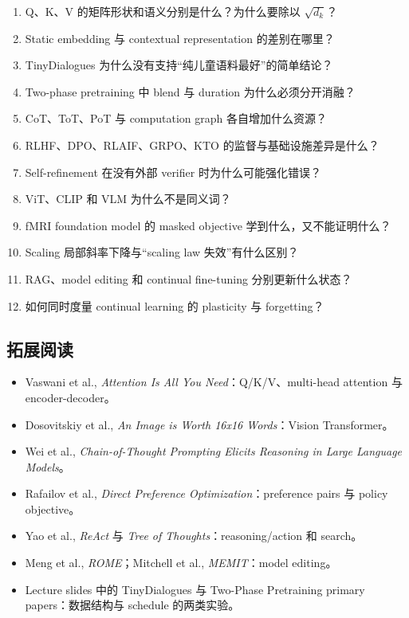 \documentclass[a4paper]{article}
\begin{document}
\begin{enumerate}
  \item Q、K、V 的矩阵形状和语义分别是什么？为什么要除以 $\sqrt{d_k}$？
  \item Static embedding 与 contextual representation 的差别在哪里？
  \item TinyDialogues 为什么没有支持“纯儿童语料最好”的简单结论？
  \item Two-phase pretraining 中 blend 与 duration 为什么必须分开消融？
  \item CoT、ToT、PoT 与 computation graph 各自增加什么资源？
  \item RLHF、DPO、RLAIF、GRPO、KTO 的监督与基础设施差异是什么？
  \item Self-refinement 在没有外部 verifier 时为什么可能强化错误？
  \item ViT、CLIP 和 VLM 为什么不是同义词？
  \item fMRI foundation model 的 masked objective 学到什么，又不能证明什么？
  \item Scaling 局部斜率下降与“scaling law 失效”有什么区别？
  \item RAG、model editing 和 continual fine-tuning 分别更新什么状态？
  \item 如何同时度量 continual learning 的 plasticity 与 forgetting？
\end{enumerate}

\subsection{拓展阅读}

\begin{itemize}
  \item Vaswani et al., \emph{Attention Is All You Need}：Q/K/V、multi-head attention 与 encoder-decoder。
  \item Dosovitskiy et al., \emph{An Image is Worth 16x16 Words}：Vision Transformer。
  \item Wei et al., \emph{Chain-of-Thought Prompting Elicits Reasoning in Large Language Models}。
  \item Rafailov et al., \emph{Direct Preference Optimization}：preference pairs 与 policy objective。
  \item Yao et al., \emph{ReAct} 与 \emph{Tree of Thoughts}：reasoning/action 和 search。
  \item Meng et al., \emph{ROME}；Mitchell et al., \emph{MEMIT}：model editing。
  \item Lecture slides 中的 TinyDialogues 与 Two-Phase Pretraining primary papers：数据结构与 schedule 的两类实验。
\end{itemize}
\end{document}
